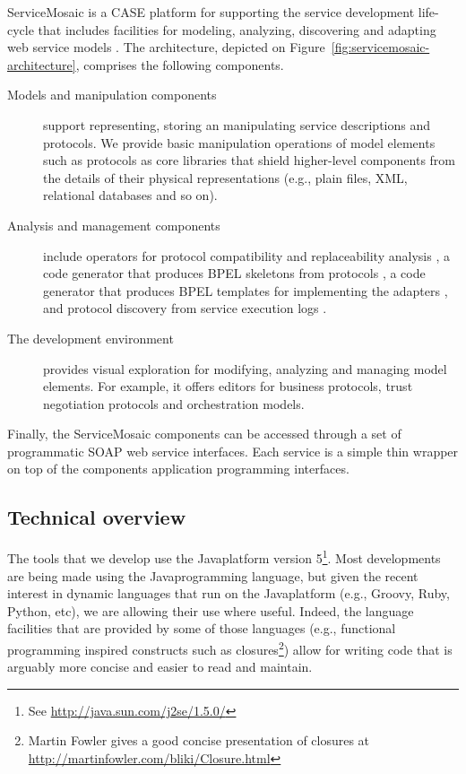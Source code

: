 ServiceMosaic is a CASE platform for supporting the service development life-cycle that includes facilities for modeling, analyzing, discovering and adapting web service models \cite{BCTPM06-SM,NezhadSBCPT07}. The architecture, depicted on Figure~\ref{fig:servicemosaic-architecture}, comprises the following components.
\begin{description}
  
  \item[Models and manipulation components] support representing, storing an manipulating service descriptions and protocols. We provide basic manipulation operations of model elements such as protocols as core libraries that shield higher-level components from the details of their physical representations (e.g., plain files, XML, relational databases and so on).
  
  \item[Analysis and management components] include operators for protocol compatibility and replaceability analysis \cite{FTBB}, a code generator that produces BPEL skeletons from protocols \cite{BBFC04}, a code generator that produces BPEL templates for implementing the adapters \cite{BenatallahCGNT05,NezhadBMCC07}, and protocol discovery from service execution logs \cite{Motahari-NezhadSBC07}.
  
  \item[The development environment] provides visual exploration for modifying, analyzing and managing model elements. For example, it offers editors for business protocols, trust negotiation protocols \cite{SkogsrudBCD04,SkogsrudBC03} and orchestration models.
  
\end{description}

Finally, the ServiceMosaic components can be accessed through a set of programmatic SOAP web service interfaces. Each service is a simple thin wrapper on top of the components application programming interfaces.


\subsection{Technical overview}


The tools that we develop use the Java\tm platform version 5\footnote{See \url{http://java.sun.com/j2se/1.5.0/}}. Most developments are being made using the Java\tm programming language, but given the recent interest in dynamic languages that run on the Java\tm platform (e.g., Groovy, Ruby, Python, etc), we are allowing their use where useful. Indeed, the language facilities that are provided by some of those languages (e.g., functional programming inspired constructs such as closures\footnote{Martin Fowler gives a good concise presentation of closures at \url{http://martinfowler.com/bliki/Closure.html}}) allow for writing code that is arguably more concise and easier to read and maintain.\\

